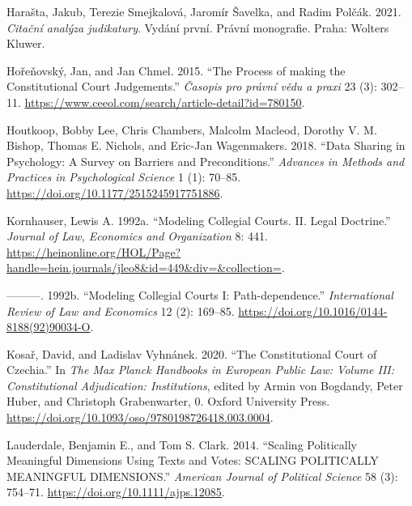 \documentclass[
  11pt,
]{article}
\newlength{\cslhangindent}
\newenvironment{CSLReferences}[2] %
 {%
  \setlength{\parindent}{0pt}
  \ifodd #1 \everypar{\setlength{\hangindent}{\cslhangindent}}\ignorespaces\fi
  \ifnum #2 > 0
  \setlength{\parskip}{#2\baselineskip}
  \fi
 }%
 {}
\begin{document}
\begin{CSLReferences}{1}{0}
\leavevmode{}%
Harašta, Jakub, Terezie Smejkalová, Jaromír Šavelka, and Radim Polčák.
2021. \emph{Citační analýza judikatury}. Vydání první. Právní
monografie. {Praha}: {Wolters Kluwer}.

\leavevmode{}%
Hořeňovský, Jan, and Jan Chmel. 2015. {``The Process of making the
Constitutional Court Judgements.''} \emph{Časopis pro právní vědu a
praxi} 23 (3): 302--11.
\url{https://www.ceeol.com/search/article-detail?id=780150}.

\leavevmode{}%
Houtkoop, Bobby Lee, Chris Chambers, Malcolm Macleod, Dorothy V. M.
Bishop, Thomas E. Nichols, and Eric-Jan Wagenmakers. 2018. {``Data
{Sharing} in {Psychology}: {A Survey} on {Barriers} and
{Preconditions}.''} \emph{Advances in Methods and Practices in
Psychological Science} 1 (1): 70--85.
\url{https://doi.org/10.1177/2515245917751886}.

\leavevmode{}%
Kornhauser, Lewis A. 1992a. {``Modeling {Collegial Courts}. {II}. {Legal
Doctrine}.''} \emph{Journal of Law, Economics and Organization} 8: 441.
\url{https://heinonline.org/HOL/Page?handle=hein.journals/jleo8&id=449&div=&collection=}.

\leavevmode{}%
---------. 1992b. {``Modeling Collegial Courts {I}:
{Path-dependence}.''} \emph{International Review of Law and Economics}
12 (2): 169--85. \url{https://doi.org/10.1016/0144-8188(92)90034-O}.

\leavevmode{}%
Kosař, David, and Ladislav Vyhnánek. 2020. {``The {Constitutional Court}
of {Czechia}.''} In \emph{The {Max Planck Handbooks} in {European Public
Law}: {Volume III}: {Constitutional Adjudication}: {Institutions}},
edited by Armin von Bogdandy, Peter Huber, and Christoph Grabenwarter,
0. {Oxford University Press}.
\url{https://doi.org/10.1093/oso/9780198726418.003.0004}.

\leavevmode{}%
Lauderdale, Benjamin E., and Tom S. Clark. 2014. {``Scaling {Politically
Meaningful Dimensions Using Texts} and {Votes}: {SCALING POLITICALLY
MEANINGFUL DIMENSIONS}.''} \emph{American Journal of Political Science}
58 (3): 754--71. \url{https://doi.org/10.1111/ajps.12085}.


\end{CSLReferences}
\end{document}
